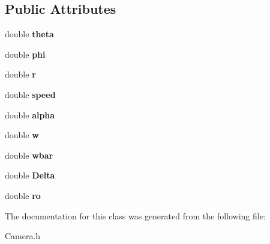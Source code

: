 \subsection*{Public Attributes}
\begin{DoxyCompactItemize}
\item 
\mbox{\label{class_camera_ab6b0614e3fd3d6cf593655030184db02}} 
double {\bfseries theta}
\item 
\mbox{\label{class_camera_a5a6955071d11d1205f10e00439f9e534}} 
double {\bfseries phi}
\item 
\mbox{\label{class_camera_a4309dd7d7a05fd6346db6de286c6ee5a}} 
double {\bfseries r}
\item 
\mbox{\label{class_camera_abbf9a8993dced65b00a37959f853b266}} 
double {\bfseries speed}
\item 
\mbox{\label{class_camera_a59df279207d3f79aa3bfa9b67aec94f0}} 
double {\bfseries alpha}
\item 
\mbox{\label{class_camera_a1b8906cd81c32e94d88390f7acf0f958}} 
double {\bfseries w}
\item 
\mbox{\label{class_camera_aebb7e4ef437c5b0fdc240311efce97a8}} 
double {\bfseries wbar}
\item 
\mbox{\label{class_camera_a3bb011122fed049857b686df5e2d69c9}} 
double {\bfseries Delta}
\item 
\mbox{\label{class_camera_afd4f1d60e22ba5a0c873464ebeade2c4}} 
double {\bfseries ro}
\end{DoxyCompactItemize}


The documentation for this class was generated from the following file\+:\begin{DoxyCompactItemize}
\item 
Camera.\+h\end{DoxyCompactItemize}
